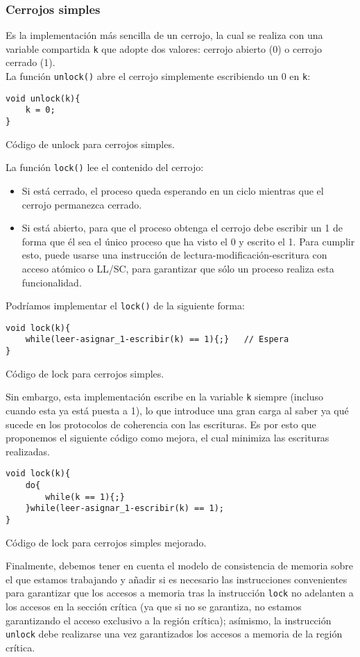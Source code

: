 \subsubsection{Cerrojos simples}
Es la implementación más sencilla de un cerrojo, la cual se realiza con una variable compartida \verb|k| que adopte dos valores: cerrojo abierto (0) o cerrojo cerrado (1).\\

La función \verb|unlock()| abre el cerrojo simplemente escribiendo un 0 en \verb|k|:
\begin{listing}[H]
\begin{verbatim}
void unlock(k){
    k = 0;
}
\end{verbatim}
\caption{Código de unlock para cerrojos simples.}
\label{unlock_cerrojos_simples}
\end{listing}

La función \verb|lock()| lee el contenido del cerrojo:
\begin{itemize}
    \item Si está cerrado, el proceso queda esperando en un ciclo mientras que el cerrojo permanezca cerrado.
    \item Si está abierto, para que el proceso obtenga el cerrojo debe escribir un 1 de forma que él sea el único proceso que ha visto el 0 y escrito el 1. Para cumplir esto, puede usarse una instrucción de lectura-modificación-escritura con acceso atómico o LL/SC, para garantizar que sólo un proceso realiza esta funcionalidad.
\end{itemize}
Podríamos implementar el \verb|lock()| de la siguiente forma:
\begin{listing}[H]
\begin{verbatim}
void lock(k){
    while(leer-asignar_1-escribir(k) == 1){;}   // Espera
}
\end{verbatim}
\caption{Código de lock para cerrojos simples.}
\label{lock_cerrojos_simples}
\end{listing}
Sin embargo, esta implementación escribe en la variable \verb|k| siempre (incluso cuando esta ya está puesta a 1), lo que introduce una gran carga al saber ya qué sucede en los protocolos de coherencia con las escrituras. Es por esto que proponemos el siguiente código como mejora, el cual minimiza las escrituras realizadas.
\begin{listing}[H]
\begin{verbatim}
void lock(k){
    do{
        while(k == 1){;}
    }while(leer-asignar_1-escribir(k) == 1);
}
\end{verbatim}
\caption{Código de lock para cerrojos simples mejorado.}
\label{lock_cerrojos_simples_mejor}
\end{listing}
Finalmente, debemos tener en cuenta el modelo de consistencia de memoria sobre el que estamos trabajando y añadir si es necesario las instrucciones convenientes para garantizar que los accesos a memoria tras la instrucción \verb|lock| no adelanten a los accesos en la sección crítica (ya que si no se garantiza, no estamos garantizando el acceso exclusivo a la región crítica); asímismo, la instrucción \verb|unlock| debe realizarse una vez garantizados los accesos a memoria de la región crítica. 

